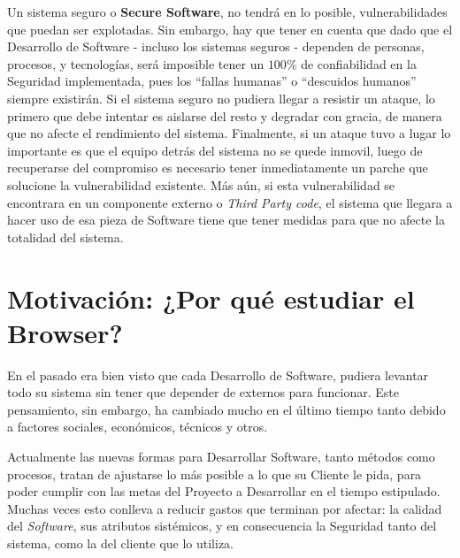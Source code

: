Un sistema seguro o \textbf{Secure Software}, no tendrá en lo posible, vulnerabilidades que puedan ser explotadas. Sin embargo, hay que tener en cuenta que dado que el Desarrollo de Software - incluso los sistemas seguros - dependen de personas, procesos, y tecnologías, será imposible tener un \(100\%\) de confiabilidad en la Seguridad implementada, pues los ``fallas humanas'' o ``descuidos humanos'' siempre existirán. Si el sistema seguro no pudiera llegar a resistir un ataque, lo primero que debe intentar es aislarse del resto y degradar con gracia, de manera que no afecte el rendimiento del sistema. Finalmente, si un ataque tuvo a lugar lo importante es que el equipo detrás del sistema no se quede inmovil, luego de recuperarse del compromiso es necesario tener inmediatamente un parche que solucione la vulnerabilidad existente. Más aún, si esta vulnerabilidad se encontrara en un componente externo o \textit{Third Party code}, el sistema que llegara a hacer uso de esa pieza de Software tiene que tener medidas para que no afecte la totalidad del sistema.



\section{Motivación: ¿Por qué estudiar el Browser?}
\label{chap1:motiv}
En el pasado era bien visto que cada Desarrollo de Software, pudiera levantar todo su sistema sin tener que depender de externos para funcionar. Este pensamiento, sin embargo, ha cambiado mucho en el último tiempo tanto debido a factores sociales, económicos, técnicos y otros. 

Actualmente las nuevas formas para Desarrollar Software, tanto métodos como procesos, tratan de ajustarse lo más posible a lo que su Cliente le pida, para poder cumplir con las metas del Proyecto a Desarrollar en el tiempo estipulado. Muchas veces esto conlleva a reducir gastos que terminan por afectar: la calidad del \textit{Software}, sus atributos sistémicos, y en consecuencia la Seguridad tanto del sistema, como la del cliente que lo utiliza.

